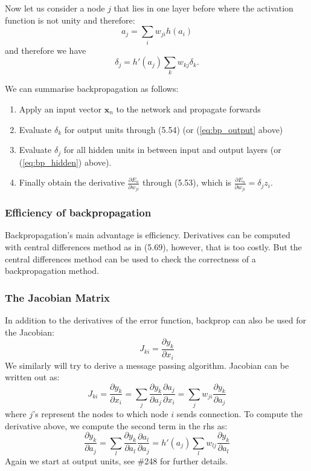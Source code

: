 \documentclass[a4paper]{article}
\newcommand{\mb}{\mathbf}
\begin{document}
Now let us consider a node $j$ that lies in one layer before where the activation function is not unity and therefore:
\begin{equation}
a_j=\sum\limits_i w_{ji} h(a_{i})
\end{equation}
%
%
and therefore we have 
\begin{equation}
\delta_j=h'(a_j)\sum_{k}w_{kj}\delta_k.
\label{eq:bp_hidden}
\end{equation}

We can summarise backpropagation as follows:
\begin{enumerate}
\setlength{\parindent}{0mm}
\item Apply an input vector $\mb{x}_n$ to the network and propagate forwards
\item Evaluate $\delta_k$ for output units through (5.54) (or (\ref{eq:bp_output} above)
\item Evaluate $\delta_j$ for all hidden units in between input and output layers (or (\ref{eq:bp_hidden}) above).
\item Finally obtain the derivative $\frac{\partial E_n}{\partial w_{ji}}$ through (5.53), which is $\frac{\partial E_n}{\partial w_{ji}}=\delta_j z_i$.
\end{enumerate}
%
%
\subsubsection{Efficiency of backpropagation}
Backpropagation's main advantage is efficiency. Derivatives can be computed with central differences method as in (5.69), however, that is too costly. But the central differences method can be used to check the correctness of a backpropagation method.

\subsubsection{The Jacobian Matrix}
In addition to the derivatives of the error function, backprop can also be used for the Jacobian:
%
\begin{equation}
J_{ki} = \frac{\partial y_k}{\partial x_i}
\end{equation}
%
We similarly will try to derive a message passing algorithm. Jacobian can be written out as:
%
\begin{equation}
J_{ki} = \frac{\partial y_k}{\partial x_i}=\sum\limits_j\frac{\partial y_k}{\partial a_j}\frac{\partial a_j}{\partial x_i}=\sum\limits_j w_{ji} \frac{\partial y_k}{\partial a_j}
\end{equation}
%
where $j$'s represent the nodes to which node $i$ sends connection. To compute the derivative above, we compute the second term in the rhs as:
%
\begin{equation}
\frac{\partial y_k}{\partial a_j}=\sum\limits_l\frac{\partial y_k}{\partial a_l}\frac{\partial a_l}{\partial a_j}=h'(a_j)\sum\limits_l w_{lj} \frac{\partial y_k}{\partial a_l}
\end{equation}
%
Again we start at output units, see \#248 for further details.
\end{document}
